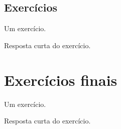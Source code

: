 \subsection*{Exercícios}

\construirExer

\begin{exer}
  Um exercício.
\end{exer}
\begin{resp}
  Resposta curta do exercício.
\end{resp}

\section{Exercícios finais}

\construirExer

\begin{exer}
  Um exercício.
\end{exer}
\begin{resp}
  Resposta curta do exercício.
\end{resp}

